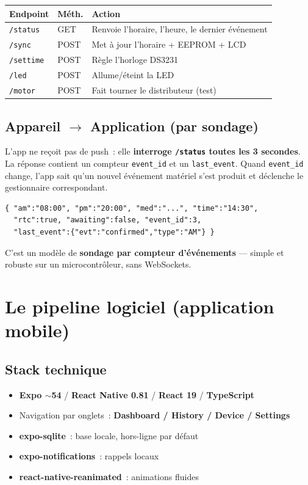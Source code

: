 \documentclass[11pt,a4paper]{article}
\begin{document}
\begin{tabularx}{\linewidth}{L{2.3cm} L{1.4cm} X}
\toprule
{}\textbf{Endpoint} & \textbf{M\'eth.} & \textbf{Action} \\
\midrule
\texttt{/status} & GET & Renvoie l'horaire, l'heure, le dernier \'ev\'enement \\
\texttt{/sync} & POST & Met \`a jour l'horaire + EEPROM + LCD \\
\texttt{/settime} & POST & R\`egle l'horloge DS3231 \\
\texttt{/led} & POST & Allume/\'eteint la LED \\
\texttt{/motor} & POST & Fait tourner le distributeur (test) \\
\bottomrule
\end{tabularx}

\subsection{Appareil $\rightarrow$ Application (par sondage)}

L'app ne re\c coit pas de push~: elle \textbf{interroge \texttt{/status} toutes les
3 secondes}. La r\'eponse contient un compteur \texttt{event\_id} et un
\texttt{last\_event}. Quand \texttt{event\_id} change, l'app sait qu'un nouvel
\'ev\'enement mat\'eriel s'est produit et d\'eclenche le gestionnaire correspondant.

\begin{lstlisting}
{ "am":"08:00", "pm":"20:00", "med":"...", "time":"14:30",
  "rtc":true, "awaiting":false, "event_id":3,
  "last_event":{"evt":"confirmed","type":"AM"} }
\end{lstlisting}

C'est un mod\`ele de \textbf{sondage par compteur d'\'ev\'enements} --- simple et robuste
sur un microcontr\^oleur, sans WebSockets.

\section{Le pipeline logiciel (application mobile)}

\subsection{Stack technique}
\begin{itemize}
  \item \textbf{Expo $\sim$54} / \textbf{React Native 0.81} / \textbf{React 19} / \textbf{TypeScript}
  \item Navigation par onglets~: \textbf{Dashboard / History / Device / Settings}
  \item \textbf{expo-sqlite}~: base locale, hors-ligne par d\'efaut
  \item \textbf{expo-notifications}~: rappels locaux
  \item \textbf{react-native-reanimated}~: animations fluides
\end{itemize}
\end{document}

